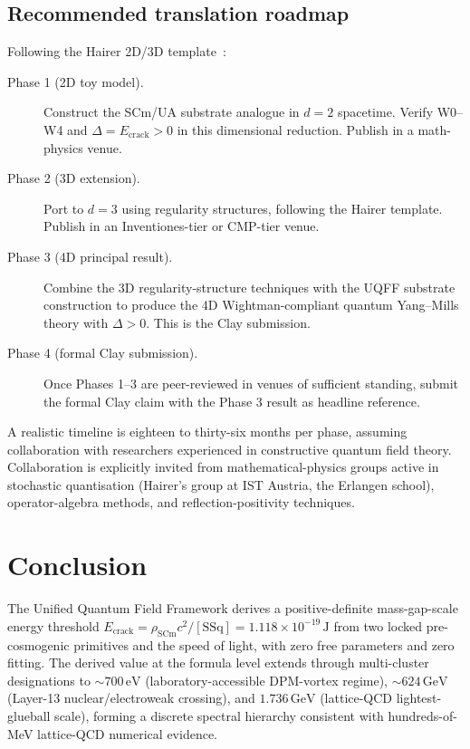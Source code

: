 \documentclass[11pt,a4paper,onecolumn]{article}
\theoremstyle{plain}
\theoremstyle{definition}
\theoremstyle{remark}
\begin{document}
\subsection{Recommended translation roadmap}
Following the Hairer 2D/3D template~\cite{hairer2024}:
\begin{description}
\item[Phase 1 (2D toy model).] Construct the SCm/UA substrate analogue
  in $d = 2$ spacetime. Verify W0--W4 and $\Delta = E_{\text{crack}} >
  0$ in this dimensional reduction. Publish in a math-physics venue.
\item[Phase 2 (3D extension).] Port to $d = 3$ using regularity
  structures, following the Hairer template. Publish in an
  Inventiones-tier or CMP-tier venue.
\item[Phase 3 (4D principal result).] Combine the 3D
  regularity-structure techniques with the UQFF substrate construction
  to produce the 4D Wightman-compliant quantum Yang--Mills theory with
  $\Delta > 0$. This is the Clay submission.
\item[Phase 4 (formal Clay submission).] Once Phases 1--3 are
  peer-reviewed in venues of sufficient standing, submit the formal
  Clay claim with the Phase 3 result as headline reference.
\end{description}

A realistic timeline is eighteen to thirty-six months per phase,
assuming collaboration with researchers experienced in constructive
quantum field theory. Collaboration is explicitly invited from
mathematical-physics groups active in stochastic quantisation
(Hairer's group at IST Austria, the Erlangen school), operator-algebra
methods, and reflection-positivity techniques.

\section{Conclusion}\label{sec:conclusion}

The Unified Quantum Field Framework derives a positive-definite
mass-gap-scale energy threshold $E_{\text{crack}} = \rho_{\mathrm{SCm}}
c^2 / [\mathrm{SSq}] = 1.118 \times 10^{-19}\,\mathrm{J}$ from two
locked pre-cosmogenic primitives and the speed of light, with zero
free parameters and zero fitting. The derived value at the formula
level extends through multi-cluster designations to
$\sim 700\,\mathrm{eV}$ (laboratory-accessible DPM-vortex regime),
$\sim 624\,\mathrm{GeV}$ (Layer-13 nuclear/electroweak crossing), and
$1.736\,\mathrm{GeV}$ (lattice-QCD lightest-glueball scale), forming
a discrete spectral hierarchy consistent with hundreds-of-MeV
lattice-QCD numerical evidence.
\end{document}

